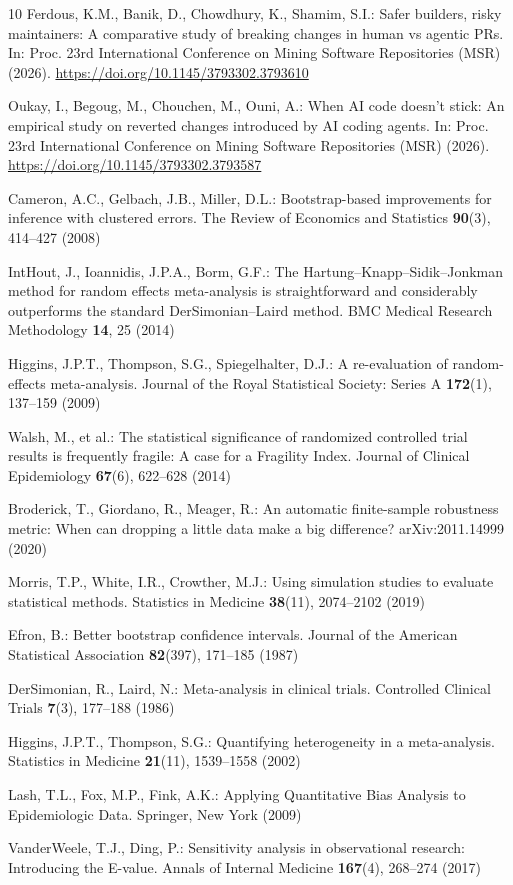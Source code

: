 \documentclass[runningheads]{llncs}
\begin{document}
\begin{thebibliography}{10}
Ferdous, K.M., Banik, D., Chowdhury, K., Shamim, S.I.: Safer builders, risky maintainers: A comparative study of breaking changes in human vs agentic PRs. In: Proc. 23rd International Conference on Mining Software Repositories (MSR) (2026). \url{https://doi.org/10.1145/3793302.3793610}

Oukay, I., Begoug, M., Chouchen, M., Ouni, A.: When AI code doesn't stick: An empirical study on reverted changes introduced by AI coding agents. In: Proc. 23rd International Conference on Mining Software Repositories (MSR) (2026). \url{https://doi.org/10.1145/3793302.3793587}

Cameron, A.C., Gelbach, J.B., Miller, D.L.: Bootstrap-based improvements for inference with clustered errors. The Review of Economics and Statistics \textbf{90}(3), 414--427 (2008)

IntHout, J., Ioannidis, J.P.A., Borm, G.F.: The Hartung--Knapp--Sidik--Jonkman method for random effects meta-analysis is straightforward and considerably outperforms the standard DerSimonian--Laird method. BMC Medical Research Methodology \textbf{14}, 25 (2014)

Higgins, J.P.T., Thompson, S.G., Spiegelhalter, D.J.: A re-evaluation of random-effects meta-analysis. Journal of the Royal Statistical Society: Series A \textbf{172}(1), 137--159 (2009)

Walsh, M., et al.: The statistical significance of randomized controlled trial results is frequently fragile: A case for a Fragility Index. Journal of Clinical Epidemiology \textbf{67}(6), 622--628 (2014)

Broderick, T., Giordano, R., Meager, R.: An automatic finite-sample robustness metric: When can dropping a little data make a big difference? arXiv:2011.14999 (2020)

Morris, T.P., White, I.R., Crowther, M.J.: Using simulation studies to evaluate statistical methods. Statistics in Medicine \textbf{38}(11), 2074--2102 (2019)

Efron, B.: Better bootstrap confidence intervals. Journal of the American Statistical Association \textbf{82}(397), 171--185 (1987)

DerSimonian, R., Laird, N.: Meta-analysis in clinical trials. Controlled Clinical Trials \textbf{7}(3), 177--188 (1986)

Higgins, J.P.T., Thompson, S.G.: Quantifying heterogeneity in a meta-analysis. Statistics in Medicine \textbf{21}(11), 1539--1558 (2002)

Lash, T.L., Fox, M.P., Fink, A.K.: Applying Quantitative Bias Analysis to Epidemiologic Data. Springer, New York (2009)

VanderWeele, T.J., Ding, P.: Sensitivity analysis in observational research: Introducing the E-value. Annals of Internal Medicine \textbf{167}(4), 268--274 (2017)

\end{thebibliography}
\end{document}
